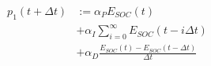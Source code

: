 \begin{equation}
\begin{split}
	p_1(t+\Delta t) &:= \alpha_P E_{SOC}(t)\\
	&+ \alpha_I \sum_{i=0}^\infty E_{SOC}(t-i\Delta t)\\
	&+ \alpha_D \frac{E_{SOC}(t)-E_{SOC}(t-\Delta t)}{\Delta t}
\end{split}
\label{ch2:equ:corrective-component-soc}
\end{equation}